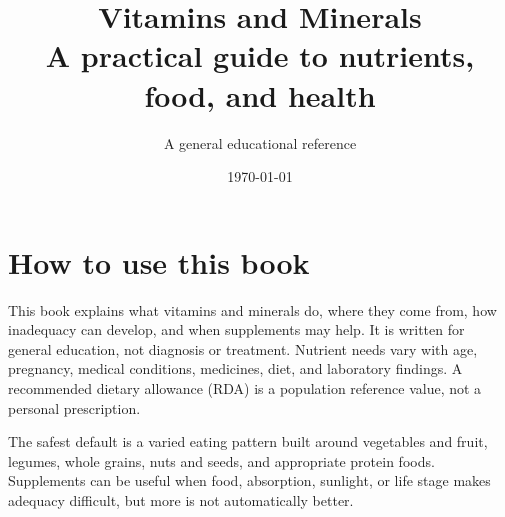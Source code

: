 \documentclass[11pt,oneside]{book}
\title{\Huge Vitamins and Minerals\\[0.4em]\Large A practical guide to nutrients, food, and health}
\author{A general educational reference}
\date{\today}
\begin{document}
\frontmatter
\maketitle
\chapter*{How to use this book}
This book explains what vitamins and minerals do, where they come from, how inadequacy can develop, and when supplements may help. It is written for general education, not diagnosis or treatment. Nutrient needs vary with age, pregnancy, medical conditions, medicines, diet, and laboratory findings. A recommended dietary allowance (RDA) is a population reference value, not a personal prescription.

The safest default is a varied eating pattern built around vegetables and fruit, legumes, whole grains, nuts and seeds, and appropriate protein foods. Supplements can be useful when food, absorption, sunlight, or life stage makes adequacy difficult, but more is not automatically better.
\end{document}
